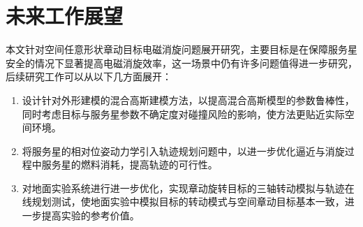 \documentclass[lang=chs, degree=master, blindreview=false, winfonts=true]{yanputhesis}
\begin{document}
\section{未来工作展望}
本文针对空间任意形状章动目标电磁消旋问题展开研究，主要目标是在保障服务星安全的情况下显著提高电磁消旋效率，这一场景中仍有许多问题值得进一步研究，后续研究工作可以从以下几方面展开：
\begin{enumerate}
	\item 设计针对外形建模的混合高斯建模方法，以提高混合高斯模型的参数鲁棒性，同时考虑目标与服务星参数不确定度对碰撞风险的影响，使方法更贴近实际空间环境。
	
	\item 将服务星的相对位姿动力学引入轨迹规划问题中，以进一步优化逼近与消旋过程中服务星的燃料消耗，提高轨迹的可行性。
	
	\item 对地面实验系统进行进一步优化，实现章动旋转目标的三轴转动模拟与轨迹在线规划测试，使地面实验中模拟目标的转动模式与空间章动目标基本一致，进一步提高实验的参考价值。
\end{enumerate}
\backmatter                                                 %
%
\end{document}
